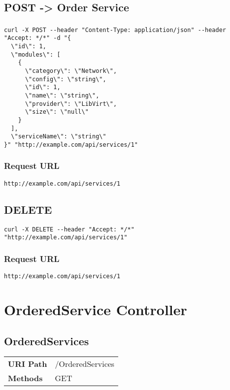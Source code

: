 \subsection{POST -> Order Service}
\subsubsection{}
\begin{lstlisting}[style=Bash] 
curl -X POST --header "Content-Type: application/json" --header "Accept: */*" -d "{
  \"id\": 1,
  \"modules\": [
    {
      \"category\": \"Network\",
      \"config\": \"string\",
      \"id\": 1,
      \"name\": \"string\",
      \"provider\": \"LibVirt\",
      \"size\": \"null\"
    }
  ],
  \"serviceName\": \"string\"
}" "http://example.com/api/services/1"
\end{lstlisting}

\subsubsection{Request URL}
\begin{lstlisting}[] 
http://example.com/api/services/1
\end{lstlisting}




\subsection{DELETE}
\begin{lstlisting}[style=Bash] 
  curl -X DELETE --header "Accept: */*" "http://example.com/api/services/1"
\end{lstlisting}

\subsubsection{Request URL}
\begin{lstlisting}[] 
http://example.com/api/services/1
\end{lstlisting}

\section{OrderedService Controller}
\subsection{OrderedServices}
\begin{tabularx}{\linewidth}{l l}
\textbf{URI Path} & /OrderedServices\\
\textbf{Methods} & GET\\
\end{tabularx}

